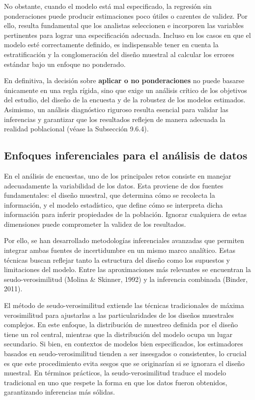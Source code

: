 \documentclass[
  spanish,
  12pt,
]{book}
\begin{document}
No obstante, cuando el modelo está mal especificado, la regresión sin ponderaciones puede producir estimaciones poco útiles o carentes de validez. Por ello, resulta fundamental que los analistas seleccionen e incorporen las variables pertinentes para lograr una especificación adecuada. Incluso en los casos en que el modelo esté correctamente definido, es indispensable tener en cuenta la estratificación y la conglomeración del diseño muestral al calcular los errores estándar bajo un enfoque no ponderado.

En definitiva, la decisión sobre \textbf{aplicar o no ponderaciones} no puede basarse únicamente en una regla rígida, sino que exige un análisis crítico de los objetivos del estudio, del diseño de la encuesta y de la robustez de los modelos estimados. Asimismo, un análisis diagnóstico riguroso resulta esencial para validar las inferencias y garantizar que los resultados reflejen de manera adecuada la realidad poblacional (véase la Subsección 9.6.4).

\subsection{Enfoques inferenciales para el análisis de datos}\label{enfoques-inferenciales-para-el-anuxe1lisis-de-datos}

En el análisis de encuestas, uno de los principales retos consiste en manejar adecuadamente la variabilidad de los datos. Esta proviene de dos fuentes fundamentales: el diseño muestral, que determina cómo se recolecta la información, y el modelo estadístico, que define cómo se interpreta dicha información para inferir propiedades de la población. Ignorar cualquiera de estas dimensiones puede comprometer la validez de los resultados.

Por ello, se han desarrollado metodologías inferenciales avanzadas que permiten integrar ambas fuentes de incertidumbre en un mismo marco analítico. Estas técnicas buscan reflejar tanto la estructura del diseño como los supuestos y limitaciones del modelo. Entre las aproximaciones más relevantes se encuentran la seudo-verosimilitud (Molina \& Skinner, 1992) y la inferencia combinada (Binder, 2011).

El método de seudo-verosimilitud extiende las técnicas tradicionales de máxima verosimilitud para ajustarlas a las particularidades de los diseños muestrales complejos. En este enfoque, la distribución de muestreo definida por el diseño tiene un rol central, mientras que la distribución del modelo ocupa un lugar secundario. Si bien, en contextos de modelos bien especificados, los estimadores basados en seudo-verosimilitud tienden a ser insesgados o consistentes, lo crucial es que este procedimiento evita sesgos que se originarían si se ignorara el diseño muestral. En términos prácticos, la seudo-verosimilitud traduce el modelo tradicional en uno que respete la forma en que los datos fueron obtenidos, garantizando inferencias más sólidas.
\end{document}
